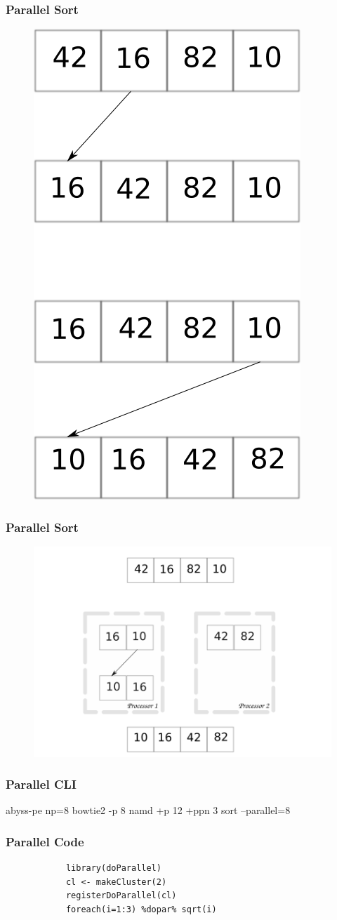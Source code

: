 
\begin{frame}
		\frametitle{Parallel Sort}
		\begin{figure}
				\includegraphics[width=0.3\linewidth]{figures/diagrams/sort/serialsort}
		\end{figure}	
\end{frame}

\begin{frame}
		\frametitle{Parallel Sort}
		\begin{figure}
				\includegraphics[width=0.8\linewidth]{figures/diagrams/sort/parallelsort}
		\end{figure}	
\end{frame}

\begin{frame}
		\frametitle{Parallel CLI}
		abyss-pe np=8\newline
		bowtie2 -p 8\newline
		namd +p 12 +ppn 3\newline
		sort --parallel=8\newline
\end{frame}


\begin{frame}[fragile]
		\frametitle{Parallel Code}
		\begin{verbatim}
			library(doParallel)
			cl <- makeCluster(2)
			registerDoParallel(cl)
			foreach(i=1:3) %dopar% sqrt(i)
		\end{verbatim}
\end{frame}

